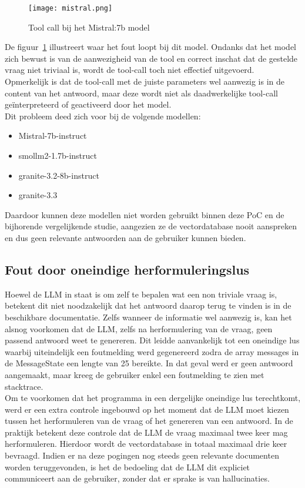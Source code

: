 \begin{figure}[H]
    \texttt{[image: mistral.png]}
    \caption{Tool call bij het Mistral:7b model}
    \label{fig:Mistral}
\end{figure}

De figuur~\ref{fig:Mistral} illustreert waar het fout loopt bij dit model. Ondanks dat het model zich bewust is van de aanwezigheid van de tool en correct inschat dat de gestelde vraag niet triviaal is, wordt de tool-call toch niet effectief uitgevoerd.
\\[1em]
Opmerkelijk is dat de tool-call met de juiste parameters wel aanwezig is in de content van het antwoord, maar deze wordt niet als daadwerkelijke tool-call geïnterpreteerd of geactiveerd door het model.
\\[1em]
Dit probleem deed zich voor bij de volgende modellen:
\begin{itemize}
    \item Mistral-7b-instruct
    \item smollm2-1.7b-instruct
    \item granite-3.2-8b-instruct
    \item granite-3.3
\end{itemize}

 Daardoor kunnen deze modellen niet worden gebruikt binnen deze PoC en de bijhorende vergelijkende studie, aangezien ze de vectordatabase nooit aanspreken en dus geen relevante antwoorden aan de gebruiker kunnen bieden.

\subsection{Fout door oneindige herformuleringslus}

Hoewel de LLM in staat is om zelf te bepalen wat een non triviale vraag is, betekent dit niet noodzakelijk dat het antwoord daarop terug te vinden is in de beschikbare documentatie. Zelfs wanneer de informatie wel aanwezig is, kan het alsnog voorkomen dat de LLM, zelfs na herformulering van de vraag, geen passend antwoord weet te genereren. Dit leidde aanvankelijk tot een oneindige lus waarbij uiteindelijk een foutmelding werd gegenereerd zodra de array messages in de MessageState een lengte van 25 bereikte. In dat geval werd er geen antwoord aangemaakt, maar kreeg de gebruiker enkel een foutmelding te zien met stacktrace.
\\[1em]
Om te voorkomen dat het programma in een dergelijke oneindige lus terechtkomt, werd er een extra controle ingebouwd op het moment dat de LLM moet kiezen tussen het herformuleren van de vraag of het genereren van een antwoord. In de praktijk betekent deze controle dat de LLM de vraag maximaal twee keer mag herformuleren. Hierdoor wordt de vectordatabase in totaal maximaal drie keer bevraagd. Indien er na deze pogingen nog steeds geen relevante documenten worden teruggevonden, is het de bedoeling dat de LLM dit expliciet communiceert aan de gebruiker, zonder dat er sprake is van hallucinaties. 


